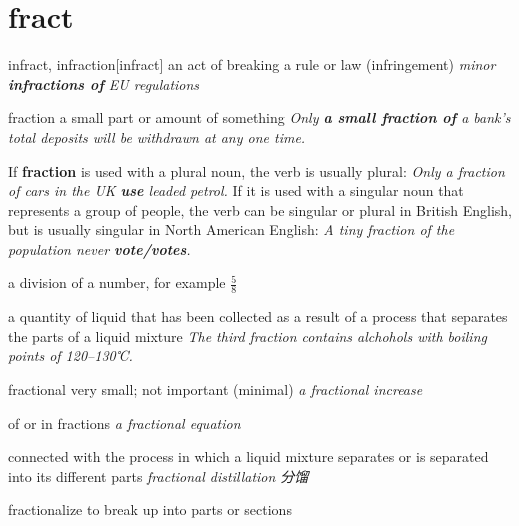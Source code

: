 \section{fract}

\begin{DefWord}{infract, infraction}[infract]
    an act of breaking a rule or law (infringement)
    \textit{minor \textbf{infractions of} EU regulations}
\end{DefWord}

\begin{DefWord}{fraction}
    a small part or amount of something
    \textit{Only \textbf{a small fraction of} a bank's total deposits will be withdrawn at any one time.}

    \begin{remark}
        If \textbf{fraction} is used with a plural noun, the verb is usually plural: \textit{Only a fraction of cars in the UK \textbf{use} leaded petrol.} If it is used with a singular noun that represents a group of people, the verb can be singular or plural in British English, but is usually singular in North American English: \textit{A tiny fraction of the population never \textbf{vote/votes}.}
    \end{remark}

    a division of a number, for example $\frac{5}{8}$

    a quantity of liquid that has been collected as a result of a process that separates the parts of a liquid mixture
    \textit{The third fraction contains alchohols with boiling points of 120–130℃.}
\end{DefWord}



\begin{DefWord}{fractional}
    very small; not important (minimal)
    \textit{a fractional increase}

    of or in fractions
    \textit{a fractional equation}

    connected with the process in which a liquid mixture separates or is separated into its different parts
    \textit{fractional distillation 分馏}

\end{DefWord}

\begin{DefWord}{fractionalize}
    to break up into parts or sections
\end{DefWord}


